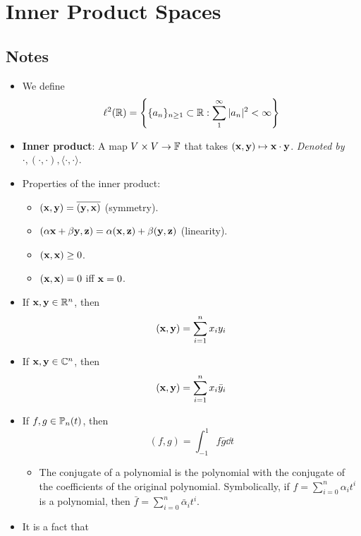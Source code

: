 \documentclass[../../notes.tex]{subfiles}
\begin{document}
\chapter{Inner Product Spaces}
\section{Notes}
\begin{itemize}
    \item {}We define
    \begin{equation*}
        \ell^2(\mathbb{R}) = \left\{ \{a_n\}_{n\geq 1}\subset\mathbb{R}:\sum_1^\infty|a_n|^2<\infty \right\}
    \end{equation*}
    \item \textbf{Inner product}: A map $V\times V\to\mathbb{F}$ that takes $(\mathbf{x},\mathbf{y})\mapsto\mathbf{x}\cdot\mathbf{y}$. \emph{Denoted by} $\cdot,(\cdot,\cdot),\langle\cdot,\cdot\rangle$.
    \item Properties of the inner product:
    \begin{itemize}
        \item $(\mathbf{x},\mathbf{y})=\overline{(\mathbf{y},\mathbf{x})}$ (symmetry).
        \item $(\alpha\mathbf{x}+\beta\mathbf{y},\mathbf{z})=\alpha(\mathbf{x},\mathbf{z})+\beta(\mathbf{y},\mathbf{z})$ (linearity).
        \item $(\mathbf{x},\mathbf{x})\geq 0$.
        \item $(\mathbf{x},\mathbf{x})=0$ iff $\mathbf{x}=0$.
    \end{itemize}
    \item If $\mathbf{x},\mathbf{y}\in\mathbb{R}^n$, then
    \begin{equation*}
        (\mathbf{x},\mathbf{y}) = \sum_{i=1}^nx_iy_i
    \end{equation*}
    \item If $\mathbf{x},\mathbf{y}\in\mathbb{C}^n$, then
    \begin{equation*}
        (\mathbf{x},\mathbf{y}) = \sum_{i=1}^nx_i\bar{y}_i
    \end{equation*}
    \item If $f,g\in\mathbb{P}_n(t)$, then
    \begin{equation*}
        (f,g) = \int_{-1}^1f\bar{g}\dd{t}
    \end{equation*}
    \begin{itemize}
        \item The conjugate of a polynomial is the polynomial with the conjugate of the coefficients of the original polynomial. Symbolically, if $f=\sum_{i=0}^n\alpha_it^i$ is a polynomial, then $\bar{f}=\sum_{i=0}^n\bar{\alpha}_it^i$.
    \end{itemize}
    \item It is a fact that

\end{itemize}
\end{document}
